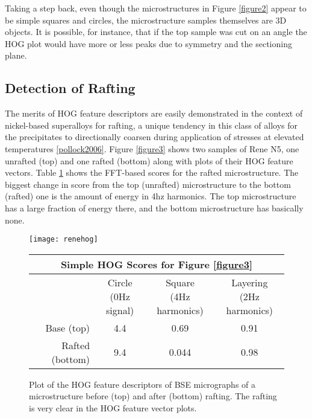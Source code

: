 \documentclass[review]{elsarticle}
\begin{document}
	Taking a step back, even though the microstructures in Figure \ref{figure2} appear to be simple squares and circles, the microstructure samples themselves are 3D objects. It is possible, for instance, that if the top sample was cut on an angle the HOG plot would have more or less peaks due to symmetry and the sectioning plane.
	 
	\subsection{Detection of Rafting}
	The merits of HOG feature descriptors are easily demonstrated in the context of nickel-based superalloys for rafting, a unique tendency in this class of alloys for the precipitates to directionally coarsen during application of stresses at elevated temperatures \ref{pollock2006}. Figure \ref{figure3} shows two samples of Rene N5, one unrafted (top) and one rafted (bottom) along with plots of their HOG feature vectors. Table \ref{table2} shows the FFT-based scores for the rafted microstructure. The biggest change in score from the top (unrafted) microstructure to the bottom (rafted) one is the amount of energy in 4hz harmonics. The top microstructure has a large fraction of energy there, and the bottom microstructure has basically none.
	
	\begin{figure}[!ht]
		\begin{center}
			\texttt{[image: renehog]}
	  		\caption{ Plot of the HOG feature descriptors of BSE micrographs of a microstructure before (top) and after (bottom) rafting. The rafting is very clear in the HOG feature vector plots. }
	  		\label{figure3}
  		
			\begin{tabular}{ r | c | c | c }
				\multicolumn{4}{c}{Simple HOG Scores for Figure \ref{figure3}} \\
				\hline
				& \shortstack{Circle \\ (0Hz signal)} & \shortstack{Square \\ (4Hz harmonics)} & \shortstack{Layering \\ (2Hz harmonics)} \\
				\hline
				Base (top) & 4.4 & 0.69 & 0.91 \\
				Rafted (bottom) & 9.4 & 0.044 & 0.98 \\
				\hline
			\end{tabular}
			
	  		\label{table2}
		\end{center}
	\end{figure}
	
\end{document}
